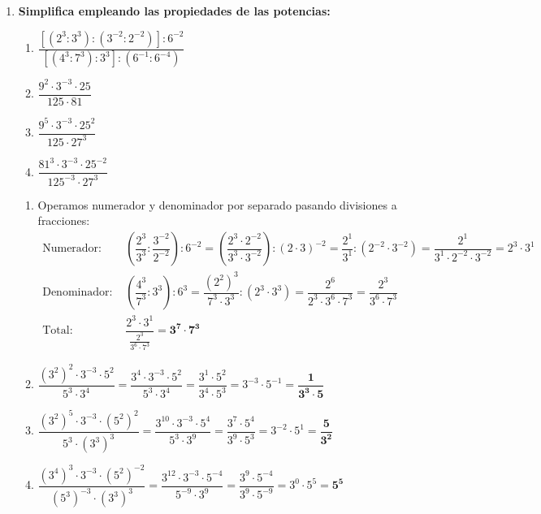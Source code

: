 \documentclass[a4paper,12pt]{article}
\begin{document}
\begin{enumerate}
    \item \textbf{Simplifica empleando las propiedades de las potencias:}
        \begin{enumerate}[label=\alph*)]
            \item $\dfrac{[(2^{3}:3^{3}):(3^{-2}:2^{-2})]:6^{-2}}{[(4^{3}:7^{3}):3^{3}]:(6^{-1}:6^{-4})}$
            \item $\dfrac{9^{2} \cdot 3^{-3} \cdot 25}{125 \cdot 81}$
            \item $\dfrac{9^{5} \cdot 3^{-3} \cdot 25^{2}}{125 \cdot 27^{3}}$
            \item $\dfrac{81^{3} \cdot 3^{-3} \cdot 25^{-2}}{125^{-3} \cdot 27^{3}}$
        \end{enumerate}
        \begin{solucion}
            \begin{enumerate}[label=\alph*)]
                \item Operamos numerador y denominador por separado pasando divisiones a fracciones:
                \begin{align*}
                \text{Numerador: } & \left(\dfrac{2^{3}}{3^{3}} : \dfrac{3^{-2}}{2^{-2}}\right) : 6^{-2} = \left(\dfrac{2^{3} \cdot 2^{-2}}{3^{3} \cdot 3^{-2}}\right) : (2 \cdot 3)^{-2} = \dfrac{2^{1}}{3^{1}} : (2^{-2} \cdot 3^{-2}) = \dfrac{2^{1}}{3^{1} \cdot 2^{-2} \cdot 3^{-2}} = 2^{3} \cdot 3^{1} \\
                \text{Denominador: } & \left(\dfrac{4^{3}}{7^{3}} : 3^{3}\right) : 6^{3} = \dfrac{(2^{2})^{3}}{7^{3} \cdot 3^{3}} : (2^{3} \cdot 3^{3}) = \dfrac{2^{6}}{2^{3} \cdot 3^{6} \cdot 7^{3}} = \dfrac{2^{3}}{3^{6} \cdot 7^{3}} \\
                \text{Total: } & \dfrac{2^{3} \cdot 3^{1}}{\frac{2^{3}}{3^{6} \cdot 7^{3}}} = \mathbf{3^{7} \cdot 7^{3}}
                \end{align*}
                \item $\dfrac{(3^{2})^{2} \cdot 3^{-3} \cdot 5^{2}}{5^{3} \cdot 3^{4}} = \dfrac{3^{4} \cdot 3^{-3} \cdot 5^{2}}{5^{3} \cdot 3^{4}} = \dfrac{3^{1} \cdot 5^{2}}{3^{4} \cdot 5^{3}} = 3^{-3} \cdot 5^{-1} = \mathbf{\dfrac{1}{3^{3} \cdot 5}}$
                \item $\dfrac{(3^{2})^{5} \cdot 3^{-3} \cdot (5^{2})^{2}}{5^{3} \cdot (3^{3})^{3}} = \dfrac{3^{10} \cdot 3^{-3} \cdot 5^{4}}{5^{3} \cdot 3^{9}} = \dfrac{3^{7} \cdot 5^{4}}{3^{9} \cdot 5^{3}} = 3^{-2} \cdot 5^{1} = \mathbf{\dfrac{5}{3^{2}}}$
                \item $\dfrac{(3^{4})^{3} \cdot 3^{-3} \cdot (5^{2})^{-2}}{(5^{3})^{-3} \cdot (3^{3})^{3}} = \dfrac{3^{12} \cdot 3^{-3} \cdot 5^{-4}}{5^{-9} \cdot 3^{9}} = \dfrac{3^{9} \cdot 5^{-4}}{3^{9} \cdot 5^{-9}} = 3^{0} \cdot 5^{5} = \mathbf{5^{5}}$
            \end{enumerate}
        \end{solucion}


\end{enumerate}
\end{document}
